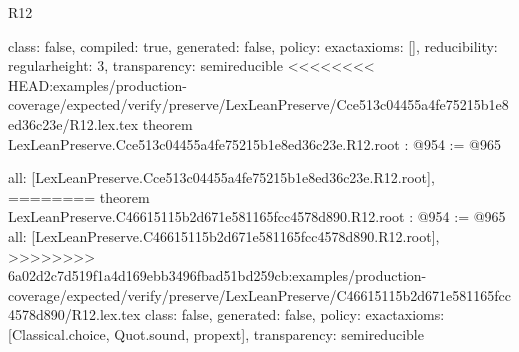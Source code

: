 \begin{lexlean}{R12}
\begin{coremodule}
{{{{{{{{  class: false,
  compiled: true,
  generated: false,
  policy: exact{axioms: []},
  reducibility: regular{height: 3},
  transparency: semireducible
}
<<<<<<<< HEAD:examples/production-coverage/expected/verify/preserve/LexLeanPreserve/Cce513c04455a4fe75215b1e8ed36c23e/R12.lex.tex
theorem LexLeanPreserve.Cce513c04455a4fe75215b1e8ed36c23e.R12.root : @954 := @965 {
  all: [LexLeanPreserve.Cce513c04455a4fe75215b1e8ed36c23e.R12.root],
========
theorem LexLeanPreserve.C46615115b2d671e581165fcc4578d890.R12.root : @954 := @965 {
  all: [LexLeanPreserve.C46615115b2d671e581165fcc4578d890.R12.root],
>>>>>>>> 6a02d2c7d519f1a4d169ebb3496fbad51bd259cb:examples/production-coverage/expected/verify/preserve/LexLeanPreserve/C46615115b2d671e581165fcc4578d890/R12.lex.tex
  class: false,
  generated: false,
  policy: exact{axioms: [Classical.choice, Quot.sound, propext]},
  transparency: semireducible
}

}}}}}}}}
\end{coremodule}
\end{lexlean}
